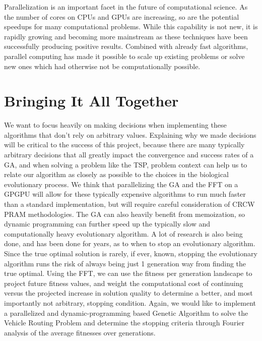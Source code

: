 \documentclass{article}
\renewcommand{\_}{\ifincsname_\else\legacyunderscore\fi}
\begin{document}
Parallelization is an important facet in the future of computational science. As the number of cores on CPUs and GPUs are increasing, so are the potential speedups for many computational problems. While this capability is not new, it is rapidly growing and becoming more mainstream as these techniques have been successfully producing positive results. Combined with already fast algorithms, parallel computing has made it possible to scale up existing problems or solve new ones which had otherwise not be computationally possible. 


\section*{Bringing It All Together}
We want to focus heavily on making decisions when implementing these algorithms that don't rely on arbitrary values. Explaining why we made decisions will be critical to the success of this project, because there are many typically arbitrary decisions that all greatly impact the convergence and success rates of a GA, and when solving a problem like the TSP, problem context can help us to relate our algorithm as closely as possible to the choices in the biological evolutionary process. We think that parallelizing the GA and the FFT on a GPGPU will allow for these typically expensive algorithms to run much faster than a standard implementation, but will require careful consideration of CRCW PRAM methodologies. The GA can also heavily benefit from memoization, so dynamic programming can further speed up the typically slow and computationally heavy evolutionary algorithm. A lot of research is also being done, and has been done for years, as to when to stop an evolutionary algorithm. Since the true optimal solution is rarely, if ever, known, stopping the evolutionary algorithm runs the risk of always being just 1 generation way from finding the true optimal. Using the FFT, we can use the fitness per generation landscape to project future fitness values, and weight the computational cost of continuing versus the projected increase in solution quality to determine a better, and most importantly not arbitrary, stopping condition. Again, we would like to implement a parallelized and dynamic-programming based Genetic Algorithm to solve the Vehicle Routing Problem and determine the stopping criteria through Fourier analysis of the average fitnesses over generations. 

\pagebreak
\printbibliography
\end{document}
